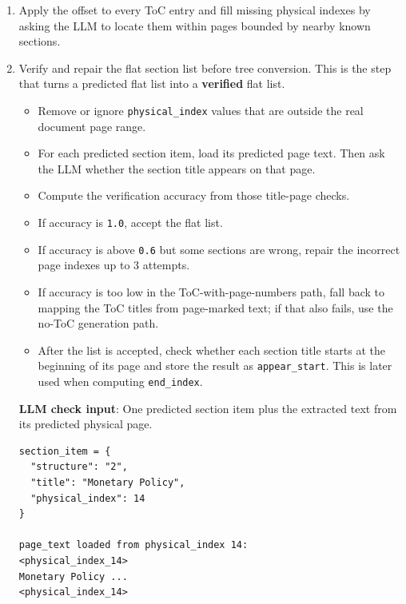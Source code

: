 \documentclass[11pt,a4paper]{article}
\newcommand{\fieldname}[1]{\textcolor{red!70!black}{\texttt{#1}}}
\begin{document}
\begin{enumerate}
\begin{itemize}
\begin{enumerate}[label=(\alph*)]
\begin{lstlisting}[style=pageTextBlockInList]
physical_index = printed page + most common offset
\end{lstlisting}
            \item Apply the offset to every ToC entry and fill missing physical indexes by asking the LLM to locate them within pages bounded by nearby known sections.
            \item Verify and repair the flat section list before tree conversion. This is the step that turns a predicted flat list into a \textbf{verified} flat list.
            \begin{itemize}
                \item Remove or ignore \fieldname{physical\_index} values that are outside the real document page range.
                \item For each predicted section item, load its predicted page text. Then ask the LLM whether the section title appears on that page.
                \item Compute the verification accuracy from those title-page checks.
                \item If accuracy is \texttt{1.0}, accept the flat list.
                \item If accuracy is above \texttt{0.6} but some sections are wrong, repair the incorrect page indexes up to 3 attempts.
                \item If accuracy is too low in the ToC-with-page-numbers path, fall back to mapping the ToC titles from page-marked text; if that also fails, use the no-ToC generation path.
                \item After the list is accepted, check whether each section title starts at the beginning of its page and store the result as \fieldname{appear\_start}. This is later used when computing \fieldname{end\_index}.
            \end{itemize}
\textbf{LLM check input}: One predicted section item plus the extracted text from its predicted physical page.
\begin{lstlisting}[style=pageTextBlockInList]
section_item = {
  "structure": "2",
  "title": "Monetary Policy",
  "physical_index": 14
}

page_text loaded from physical_index 14:
<physical_index_14>
Monetary Policy ...
<physical_index_14>


\end{lstlisting}
\end{enumerate}
\end{itemize}
\end{enumerate}
\end{document}
